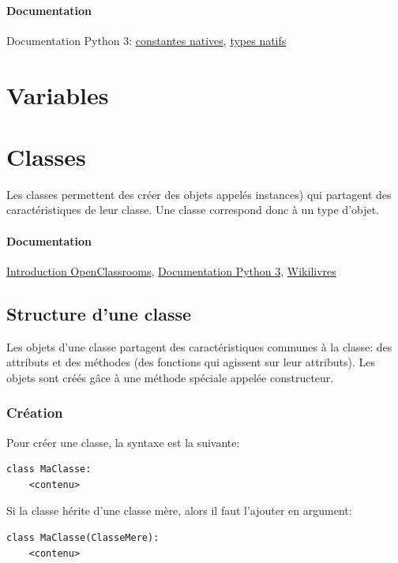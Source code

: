 \documentclass[a4paper, 10pt]{article}
\begin{document}
\paragraph{Documentation} Documentation Python 3: \href{https://docs.python.org/fr/3/library/constants.html}{constantes natives}, \href{https://docs.python.org/fr/3/library/stdtypes.html}{types natifs}
\section{Variables}


\section{Classes}
 Les classes permettent des créer des objets appelés instances) qui partagent des caractéristiques de leur classe. Une classe correspond donc à un type d'objet.

\paragraph{Documentation} \href{https://openclassrooms.com/courses/apprenez-a-programmer-en-python/premiere-approche-des-classes}{Introduction OpenClassrooms}, \href{https://docs.python.org/fr/3/tutorial/classes.html}{Documentation Python 3}, \href{https://fr.wikibooks.org/wiki/Programmation_Python/Classes#Définition_d'une_classe_élé mentaire}{Wikilivres}
\subsection{Structure d'une classe}
Les objets d'une classe partagent des caractéristiques communes à la classe: des attributs et des méthodes (des fonctions qui agissent sur leur attributs). Les objets sont créés g\^ace à une méthode spéciale appelée constructeur.

\subsubsection{Création}
Pour créer une classe, la syntaxe est la suivante:
\begin{verbatim}
class MaClasse:
    <contenu>
\end{verbatim}

Si la classe hérite d'une classe mère, alors il faut l'ajouter en argument:
\begin{verbatim}
class MaClasse(ClasseMere):
    <contenu>
\end{verbatim}
\end{document}
